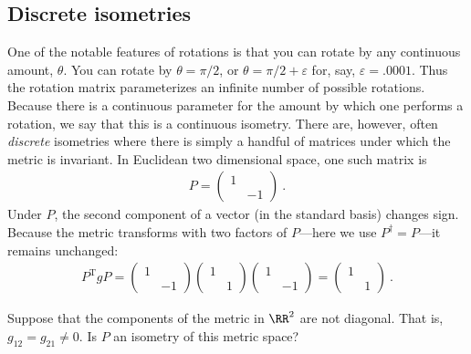 \begin{subappendices}
\section{Discrete isometries}
\label{sec:discrete:isometries}

One of the notable features of rotations is that you can rotate by any continuous amount, $\theta$. You can rotate by $\theta=\pi/2$, or $\theta = \pi/2 + \varepsilon$ for, say, $\varepsilon = .0001$. Thus the rotation matrix parameterizes an infinite number of possible rotations. Because there is a continuous parameter for the amount by which one performs a rotation, we say that this is a continuous isometry. There are, however, often \emph{discrete} isometries where there is simply a handful of matrices under which the metric is invariant. In Euclidean two dimensional space, one such matrix is 
\begin{align}
    P = \begin{pmatrix}
        1 & \\
        & -1 
    \end{pmatrix} \ .
\end{align}
Under $P$, the second component of a vector (in the standard basis) changes sign. Because the metric transforms with two factors of $P$---here we use $P^\dag = P$---it remains unchanged:
\begin{align}
    P^\text{T}gP = 
    \begin{pmatrix}
        1 & \\ 
        & -1 
    \end{pmatrix}
    \begin{pmatrix}
        1 & \\ 
        & 1 
    \end{pmatrix}
    \begin{pmatrix}
        1 & \\ 
        & -1 
    \end{pmatrix}
    = 
    \begin{pmatrix}
        1 & \\ 
        & 1 
    \end{pmatrix} \ .
\end{align}
\begin{exercise}
Suppose that the components of the metric in $\RR^2$ are not diagonal. That is, $g_{12} = g_{21}\neq 0$. Is $P$ an isometry of this metric space?
\end{exercise}


\end{subappendices}
